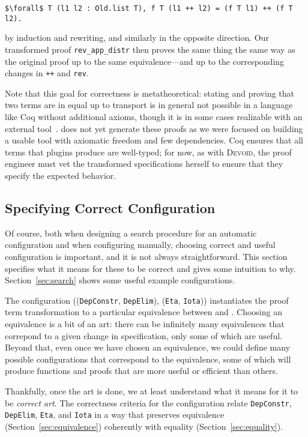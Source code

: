 \begin{lstlisting}
$\forall$ T (l1 l2 : Old.list T), f T (l1 ++ l2) = (f T l1) ++ (f T l2).
\end{lstlisting}
by induction and rewriting, and similarly in the opposite direction.
Our transformed proof \lstinline{rev_app_distr} then proves the same thing the same way
as the original proof up to the same equivalence---and up to the corresponding changes in \lstinline{++}
and \lstinline{rev}.

Note that this goal for correctness is metatheoretical:
stating and proving that two terms are in equal up to transport is in general not possible in a language like Coq
without additional axioms, though it is in some cases realizable with an external tool~\cite{tabareau2017equivalences}.
\toolname does not yet generate these proofs as we were focused on building a usable tool with axiomatic freedom and few dependencies.
Coq ensures that all terms that plugins produce are well-typed; for now, as with \textsc{Devoid}, the proof engineer must vet the transformed
specifications herself to ensure that they specify the expected behavior.

\subsection{Specifying Correct Configuration}
\label{sec:art}

Of course, both when designing a search procedure for an automatic configuration and when
configuring \toolname manually, choosing correct and useful configuration is important,
and it is not always straightforward. This section specifies what it means for these
to be correct and gives some intuition to why.
Section~\ref{sec:search} shows some useful example configurations.

The configuration ((\lstinline{DepConstr}, \lstinline{DepElim}), (\lstinline{Eta}, \lstinline{Iota})) instantiates
the proof term transformation to a particular equivalence between \A and \B.
Choosing an equivalence is a bit of an art:
there can be infinitely many equivalences that correpond to a 
given change in specification, only some of which are useful.
Beyond that, even once we have chosen an equivalence, we could define many possible configurations that correspond
to the equivalence, some of which will produce functions and proofs that are more useful or efficient than others.

Thankfully, once the art is done, we at least understand what it means for it to be \textit{correct art}.
The correctness criteria for the configuration relate \lstinline{DepConstr}, \lstinline{DepElim}, \lstinline{Eta}, and \lstinline{Iota}
in a way that preserves equivalence (Section~\ref{sec:equivalence}) coherently with equality (Section~\ref{sec:equality}).

